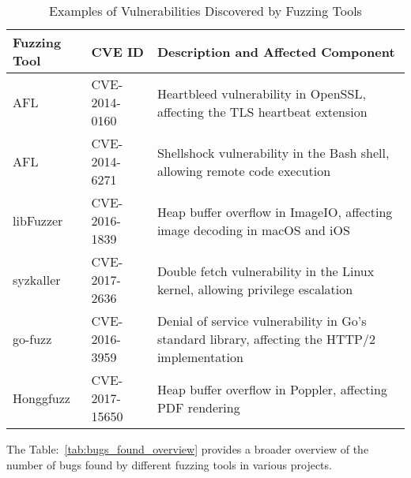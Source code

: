 \begin{table}[h!]
\centering
\begin{tabularx}{\textwidth}{@{}>{\raggedright\arraybackslash}p{2cm}>{\raggedright\arraybackslash}p{3cm}X@{}}
\toprule
\textbf{Fuzzing Tool} & \textbf{CVE ID} & \textbf{Description and Affected Component} \\
\midrule
AFL & CVE-2014-0160 & Heartbleed vulnerability in OpenSSL, affecting the TLS heartbeat extension~\cite{durumeric2014matter} \\
\addlinespace
AFL & CVE-2014-6271 & Shellshock vulnerability in the Bash shell, allowing remote code execution~\cite{shetty2018shellshock} \\
\addlinespace
libFuzzer & CVE-2016-1839  & Heap buffer overflow in ImageIO, affecting image decoding in macOS and iOS \\
\addlinespace
syzkaller & CVE-2017-2636  & Double fetch vulnerability in the Linux kernel, allowing privilege escalation~\cite{wang2017double} \\
\addlinespace
go-fuzz & CVE-2016-3959  & Denial of service vulnerability in Go's standard library, affecting the HTTP/2 implementation \\
\addlinespace
Honggfuzz & CVE-2017-15650  & Heap buffer overflow in Poppler, affecting PDF rendering~\cite{haller2013dowsing} \\
\bottomrule
\end{tabularx}
\caption{Examples of Vulnerabilities Discovered by Fuzzing Tools}
\label{tab:vulnerabilities_examples}
\end{table}


The Table:~\ref{tab:bugs_found_overview} provides a broader overview of the number of bugs found by
different fuzzing tools in various projects.

